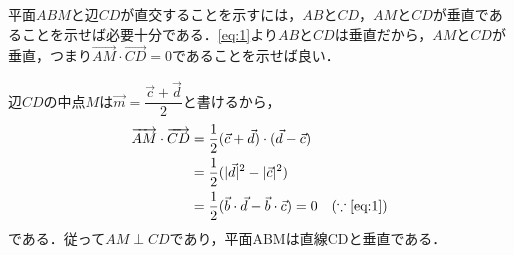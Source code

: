 \documentclass[../../main.tex]{subfiles}
\begin{document}
平面$ABM$と辺$CD$が直交することを示すには，$AB$と$CD$，$AM$と$CD$が垂直であることを示せば必要十分である．\cref{eq:1}より$AB$と$CD$は垂直だから，$AM$と$CD$が垂直，つまり$\overrightarrow{AM}\cdot\overrightarrow{CD}=0$であることを示せば良い．

辺$CD$の中点$M$は$\vec{m}=\dfrac{\vec{c}+\vec{d}}{2}$と書けるから，
\begin{align}
  \overrightarrow{AM}\cdot\overrightarrow{CD}
  &=\dfrac{1}{2}(\vec{c}+\vec{d})\cdot(\vec{d}-\vec{c})\\
  &=\dfrac{1}{2}(|\vec{d}|^2-|\vec{c}|^2)\\
  &=\dfrac{1}{2}(\vec{b}\cdot\vec{d}-\vec{b}\cdot\vec{c})=0 \quad (\because\text{\cref{eq:1}})
\end{align}
である．従って$AM\perp CD$であり，平面ABMは直線CDと垂直である．
\end{document}
